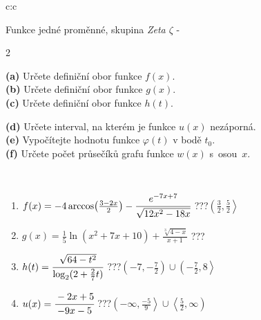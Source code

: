 \documentclass[10pt]{report}
\begin{document}
\begin{tabular}{c:c}
\begin{minipage}[c][104.5mm][t]{0.5\linewidth}
\begin{center}
\vspace{7mm}
{\huge Funkce jedné proměnné, skupina \textit{Zeta $\zeta$} -}\\[5mm]
\begin{minipage}{0.95\linewidth}
\begin{center}
{\small \begin{multicols}{2} \raggedright
\textbf{(a)} Určete definiční obor funkce \(f(x)\). \\[1mm]
\textbf{(b)} Určete definiční obor funkce \(g(x)\). \\[1mm]
\textbf{(c)} Určete definiční obor funkce \(h(t)\). \par \columnbreak
\textbf{(d)} Určete interval, na kterém je funkce \(u(x)\) nezáporná. \\[1mm]
\textbf{(e)} Vypočítejte hodnotu funkce \(\varphi(t)\) v bodě \(t_0\). \\[1mm]
\textbf{(f)} Určete počet průsečíků grafu funkce \(w(x)\) s~osou~\(x\). \\[1mm]
\end{multicols}
}
\end{center}
\end{minipage}
\\[4mm]
\begin{minipage}{0.79\linewidth}
\begin{center}
\begin{varwidth}{\linewidth}
\begin{enumerate}
\small
\item $f(x) = -4\arccos\!\left( \frac{3-2x}{2} \right) - \cfrac{e^{-7x+7}}{\sqrt{12x^2-18x}}$\quad \dotfill\; ???\;\dotfill \quad $\left(\frac{3}{2} , \frac{5}{2}\right\rangle$
\item $g(x) = \frac{1}{5} \ln{\!(x^2+7x+10)}+\frac{\sqrt[3]{4-x}}{x+1}$\quad \dotfill\; ???\;\dotfill {}
\item $h(t) = \cfrac{\sqrt{64-t^2}}{\log_2(2+\frac{2}{7}t)}$\quad \dotfill\; ???\;\dotfill \quad $\left(-7 , -\frac{7}{2}\right)\cup\left(-\frac{7}{2} , 8\right\rangle$
\item $u(x) = \cfrac{-2x+5}{-9x-5}$\quad \dotfill\; ???\;\dotfill \quad $\left(-\infty , \frac{-5}{9}\right\rangle\cup\left\langle\frac{5}{2} , \infty\right)$

\end{enumerate}
\end{varwidth}
\end{center}
\end{minipage}
\end{center}
\end{minipage}
\end{tabular}
\end{document}
